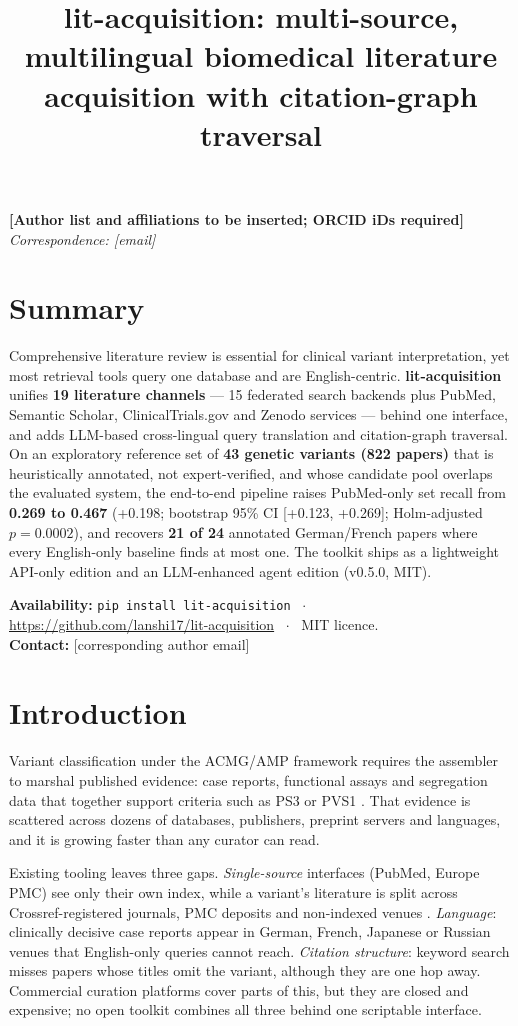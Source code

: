 \documentclass[10pt,twocolumn,letterpaper]{article}
\title{\vspace{-1.6em}\bfseries lit-acquisition: multi-source, multilingual biomedical
literature acquisition with citation-graph traversal\vspace{-0.4em}}
\author{}
\date{}
\newcommand{\authornote}{%
  \begin{center}
  \footnotesize\textbf{[Author list and affiliations to be inserted; ORCID iDs required]}\\[2pt]
  \textit{Correspondence: [email]}
  \end{center}}
\begin{document}
\maketitle
\thispagestyle{empty}
\vspace{-3.2em}
\authornote
\vspace{-0.6em}

\section*{Summary}
Comprehensive literature review is essential for clinical variant
interpretation, yet most retrieval tools query one database and are
English-centric. \textbf{lit-acquisition} unifies \textbf{19 literature
channels} --- 15 federated search backends plus PubMed, Semantic Scholar,
ClinicalTrials.gov and Zenodo services --- behind one interface, and adds
LLM-based cross-lingual query translation and citation-graph traversal. On an
exploratory reference set of \textbf{43 genetic variants (822 papers)} that is
heuristically annotated, not expert-verified, and whose candidate pool overlaps
the evaluated system, the end-to-end pipeline raises PubMed-only set recall from
\textbf{0.269 to 0.467} (+0.198; bootstrap 95\% CI [+0.123, +0.269];
Holm-adjusted $p=0.0002$), and recovers \textbf{21 of 24} annotated
German/French papers where every English-only baseline finds at most one. The
toolkit ships as a lightweight API-only edition and an LLM-enhanced agent
edition (v0.5.0, MIT).

\noindent\textbf{Availability:} \texttt{pip install lit-acquisition} ~$\cdot$~
\url{https://github.com/lanshi17/lit-acquisition} ~$\cdot$~ MIT licence.\\
\noindent\textbf{Contact:} [corresponding author email]

\section{Introduction}
Variant classification under the ACMG/AMP framework requires the assembler to
marshal published evidence: case reports, functional assays and segregation
data that together support criteria such as PS3 or PVS1 \cite{richards2015}.
That evidence is scattered across dozens of databases, publishers, preprint
servers and languages, and it is growing faster than any curator can read.

Existing tooling leaves three gaps. \emph{Single-source} interfaces (PubMed,
Europe PMC) see only their own index, while a variant's literature is split
across Crossref-registered journals, PMC deposits and non-indexed venues
\cite{sayers2024,ferguson2021,visser2021}. \emph{Language}: clinically decisive
case reports appear in German, French, Japanese or Russian venues that
English-only queries cannot reach. \emph{Citation structure}: keyword search
misses papers whose titles omit the variant, although they are one hop away.
Commercial curation platforms cover parts of this, but they are closed and
expensive; no open toolkit combines all three behind one scriptable
interface.
\end{document}
